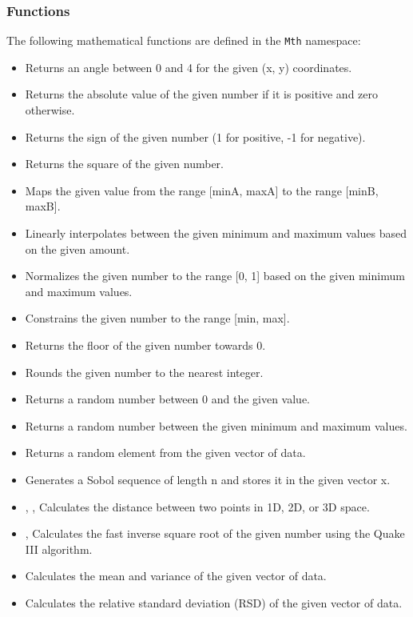 \documentclass[a4paper,onecolumn,11pt]{doofus}
\begin{document}
\subsubsection*{Functions}

The following mathematical functions are defined in the \texttt{Mth} namespace:
%
\begin{itemize}
\item {} Returns an angle between 0 and 4 for the given (x, y) coordinates.
\item {} Returns the absolute value of the given number if it is positive and zero otherwise.
\item {} Returns the sign of the given number (1 for positive, -1 for negative).
\item {} Returns the square of the given number.
\item {} Maps the given value from the range [minA, maxA] to the range [minB, maxB].
\item {} Linearly interpolates between the given minimum and maximum values based on the given amount.
\item {} Normalizes the given number to the range [0, 1] based on the given minimum and maximum values.
\item {} Constrains the given number to the range [min, max].
\item {} Returns the floor of the given number towards 0.
\item {} Rounds the given number to the nearest integer.
\item {} Returns a random number between 0 and the given value.
\item {} Returns a random number between the given minimum and maximum values.
\item {} Returns a random element from the given vector of data.
\item {} Generates a Sobol sequence of length n and stores it in the given vector x.
\item {}, ,  Calculates the distance between two points in 1D, 2D, or 3D space.
\item {},  Calculates the fast inverse square root of the given number using the Quake III algorithm.
\item {} Calculates the mean and variance of the given vector of data.
\item {} Calculates the relative standard deviation (RSD) of the given vector of data.
\end{itemize}
\end{document}
